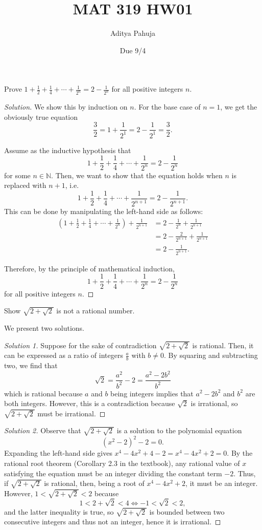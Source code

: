 \documentclass[11pt]{scrartcl}
\title{\vspace{-2em}MAT 319 HW01}
\author{\large Aditya Pahuja}
\date{\large Due 9/4}
\providecommand{\half}{\frac{1}{2}}
\providecommand{\NN}{\mathbb N}
\newenvironment{soln}{\begin{proof}[Solution]}{\end{proof}}
\begin{document}
\maketitle
\begin{problem*}[1.5]
	Prove $1 + \half + \frac 14 + \cdots + \frac{1}{2^n} = 2 - \frac1{2^n}$
	for all positive integers $n$.
\end{problem*}
\begin{soln}
	We show this by induction on $n$.
	For the base case of $n = 1$, we get the obviously true equation
	\[\frac 32 = 1 + \frac{1}{2^1} = 2 - \frac{1}{2^1} = \frac{3}{2}.\]
	
	Assume as the inductive hypothesis that
	\[1 + \half + \frac 14 + \cdots + \frac{1}{2^n} = 2 - \frac1{2^n}\]
	for some $n\in\NN$. Then, we want to show that the equation holds
	when $n$ is replaced with $n + 1$, i.e.
	\[1 + \half + \frac 14 + \cdots + \frac{1}{2^{n + 1}} =
	2 - \frac1{2^{n + 1}}.\]
	This can be done by manipulating the left-hand side as follows:
	\begin{align*}
		\left(1 + \half + \frac 14 + \cdots + \frac{1}{2^n}\right)
		+ \frac{1}{2^{n+1}} &= 2 - \frac1{2^n} + \frac{1}{2^{n+1}}\\
		&= 2 - \frac{2}{2^{n+1}} + \frac{1}{2^{n+1}}\\
		&= 2 - \frac{1}{2^{n+1}}.
	\end{align*}
	
	Therefore, by the principle of mathematical induction,
	\[1 + \frac12 + \frac{1}{4} + \cdots + \frac{1}{2^n} = 2 - \frac{1}{2^n}\]
	for all positive integers $n$.
\end{soln}

\begin{problem*}[2.3]
	Show $\sqrt{2+\sqrt2}$ is not a rational number.
\end{problem*}
We present two solutions.
\begin{proof}[Solution 1]
	Suppose for the sake of contradiction $\sqrt{2 + \sqrt2}$ is rational.
	Then, it can be expressed as a ratio of integers $\frac ab$ with $b\ne 0$.
	By squaring and subtracting two, we find that
	\[\sqrt 2 = \frac{a^2}{b^2} - 2 = \frac{a^2 - 2b^2}{b^2}\]
	which is rational because $a$ and $b$ being integers implies that
	$a^2 - 2b^2$ and $b^2$ are both integers.
	However, this is a contradiction because $\sqrt 2$ is irrational,
	so $\sqrt{2 + \sqrt 2}$ must be irrational.
\end{proof}
\begin{proof}[Solution 2]
	Observe that $\sqrt{2 + \sqrt2}$ is a solution to the polynomial equation
	\[(x^2 - 2)^2 - 2 = 0.\]
	Expanding the left-hand side gives
	$x^4 - 4x^2 + 4 - 2 = x^4 - 4x^2 + 2 = 0$.
	By the rational root theorem (Corollary 2.3 in the textbook),
	any rational value of $x$ satisfying the equation
	must be an integer dividing the constant term $-2$.
	Thus, if $\sqrt{2 + \sqrt2}$ is rational, then, being a root
	of $x^4 - 4x^2 + 2$, it must be an integer.
	However, $1 < \sqrt{2 + \sqrt2} < 2$ because
	\[1 < 2 + \sqrt 2 < 4 \iff -1 < \sqrt 2 < 2,\]
	and the latter inequality is true,
	so $\sqrt{2 + \sqrt2}$ is bounded between two consecutive integers and thus
	not an integer, hence it is irrational.
\end{proof}
\end{document}
